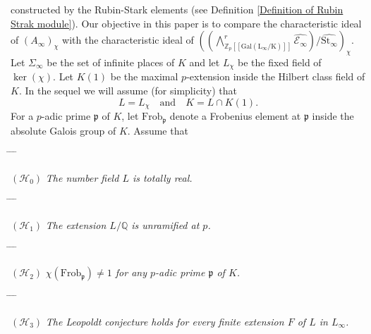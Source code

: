 \documentclass[reqno]{amsart}
\begin{document}
constructed by the Rubin-Stark elements (see Definition
\ref{Definition of Rubin Strak module}). Our objective in this paper
is to compare the characteristic ideal of $(A_{\infty})_{\chi}$ with
the characteristic ideal of
$((\bigwedge^{r}_{\mathbb{Z}_{p}[[\mathrm{Gal(L_{\infty}/K)}]]}\widehat{\mathcal{E}_{\infty}})/\widehat{\mathrm{St}_{\infty}})_{\chi}$.
Let $\Sigma_{\infty}$ be the set of infinite places of $K$ and let
$L_{\chi}$ be the fixed field of $\ker(\chi)$. Let $K(1)$ be the
maximal $p$-extension inside the Hilbert class field of $K$. In the
sequel we will assume  (for simplicity) that
\begin{equation*}\label{simplicity}
L=L_{\chi} \quad\mbox{and}\quad K=L\cap K(1).
\end{equation*}
For a $p$-adic prime $\mathfrak{p}$ of $K$, let
 $\mathrm{Frob}_{\mathfrak{p}}$ denote a Frobenius element at
 $\mathfrak{p}$ inside the absolute Galois group of $K$.
 Assume that
 \begin{center}
  \begin{tabbing}
  \hspace{1cm}\=\hspace{0.4cm} \= \hspace{0.4cm} \= \kill
  
  \>$(\mathcal{H}_{0})$ \> \> \textit{The number field $L$ is totally real.}
\end{tabbing}
\end{center}
\begin{center}
  \begin{tabbing}
  \hspace{1cm}\=\hspace{0.4cm} \= \hspace{0.4cm} \= \kill
  
  \>$(\mathcal{H}_{1})$ \> \> \textit{ The extension $L/\mathbb{Q}$ is unramified at $p$.}
\end{tabbing}
\end{center}
\begin{center}
  \begin{tabbing}
  \hspace{1cm}\=\hspace{0.4cm} \= \hspace{0.4cm} \= \kill
  
  \>$(\mathcal{H}_{2})$ \> \> \textit{ $\chi(\mathrm{Frob}_{\mathfrak{p}})\neq
    1$ for any $p$-adic prime $\mathfrak{p}$ of $K$.}
\end{tabbing}
\end{center}
\begin{center}
  \begin{tabbing}
  \hspace{1cm}\=\hspace{0.4cm} \= \hspace{0.4cm} \= \kill
  
  \>$(\mathcal{H}_{3})$ \> \> \textit{
   The Leopoldt  conjecture holds for every finite extension $F$ of $L$ in $L_{\infty}$.}
\end{tabbing}
\end{center}
\end{document}

